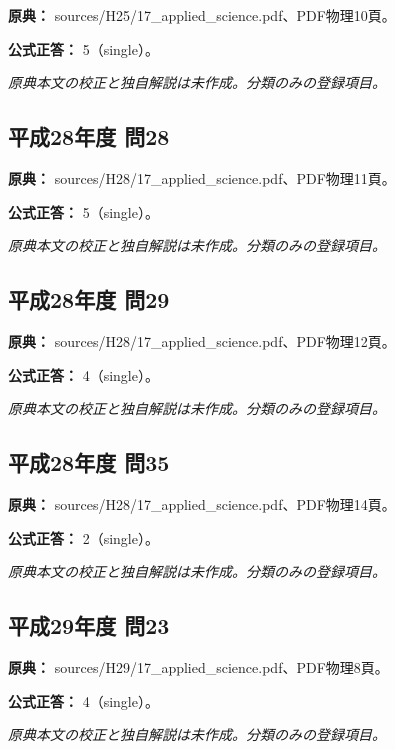 \noindent\textbf{原典：} sources/H25/17\_applied\_science.pdf、PDF物理10頁。

\textbf{公式正答：} 5（single）。

\par\textit{原典本文の校正と独自解説は未作成。分類のみの登録項目。}

\subsection{平成28年度 問28}
\label{q:h28-reg-applied-28}

\noindent\textbf{原典：} sources/H28/17\_applied\_science.pdf、PDF物理11頁。

\textbf{公式正答：} 5（single）。

\par\textit{原典本文の校正と独自解説は未作成。分類のみの登録項目。}

\subsection{平成28年度 問29}
\label{q:h28-reg-applied-29}

\noindent\textbf{原典：} sources/H28/17\_applied\_science.pdf、PDF物理12頁。

\textbf{公式正答：} 4（single）。

\par\textit{原典本文の校正と独自解説は未作成。分類のみの登録項目。}

\subsection{平成28年度 問35}
\label{q:h28-reg-applied-35}

\noindent\textbf{原典：} sources/H28/17\_applied\_science.pdf、PDF物理14頁。

\textbf{公式正答：} 2（single）。

\par\textit{原典本文の校正と独自解説は未作成。分類のみの登録項目。}

\subsection{平成29年度 問23}
\label{q:h29-reg-applied-23}

\noindent\textbf{原典：} sources/H29/17\_applied\_science.pdf、PDF物理8頁。

\textbf{公式正答：} 4（single）。

\par\textit{原典本文の校正と独自解説は未作成。分類のみの登録項目。}

